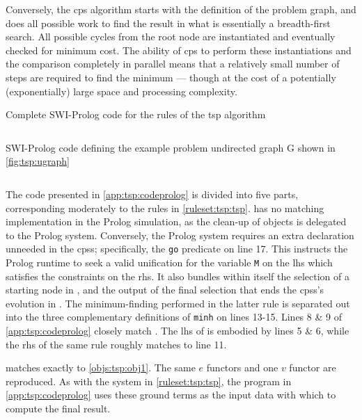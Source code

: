 Conversely, the \gls{cps} algorithm starts with the definition of the problem graph, and does all possible work to find the result in what is essentially a breadth-first search.  All possible cycles from the root node are instantiated and eventually checked for minimum cost. The ability of \gls{cps} to perform these instantiations and the comparison completely in parallel means that a relatively small number of steps are required to find the minimum --- though at the cost of a potentially (exponentially) large space and processing complexity.

\begin{listing}
\caption[Complete SWI-Prolog code for the  algorithm]{\label{app:tsp:codeprolog}Complete SWI-Prolog code for the rules of the \gls{tsp} algorithm}
\inputminted[linenos,breaklines,frame=lines,autogobble,firstline=5]{prolog}{chapters/tsp/code/tsp.pl.txt}
\end{listing}

\begin{listing}
\caption{\label{app:tsp:probprolog}SWI-Prolog code defining the example problem undirected graph G shown in \cref{fig:tsp:ugraph}}
\inputminted[linenos,breaklines,frame=lines,autogobble,lastline=3]{prolog}{chapters/tsp/code/tsp.pl.txt}
\end{listing}

The code presented in \cref{app:tsp:codeprolog} is divided into five parts, corresponding moderately to the rules in \cref{ruleset:tsp:tsp}.   has no matching implementation in the Prolog simulation, as the clean-up of objects is delegated to the Prolog system.  Conversely, the Prolog system requires an extra declaration unneeded in the \glspl{cps}; specifically, the \texttt{go} predicate on line 17.  This instructs the Prolog runtime to seek a valid unification for the variable \texttt{M} on the \gls{lhs} which satisfies the constraints on the \gls{rhs}.  It also bundles within itself the selection of a starting node in , and the output of the final selection that ends the \glspl{cps}'s evolution in .  The minimum-finding performed in the latter rule is separated out into the three complementary definitions of \texttt{minh} on lines 13-15.  Lines 8 \& 9 of \cref{app:tsp:codeprolog} closely match .  The \gls{lhs} of  is embodied by lines 5 \& 6, while the \gls{rhs} of the same rule roughly matches to line 11.

 matches exactly to \cref{objs:tsp:obj1}.  The same \(e\) \glspl{functor} and one \(v\) \gls{functor} are reproduced.  As with the system in \cref{ruleset:tsp:tsp}, the program in \cref{app:tsp:codeprolog} uses these ground terms as the input data with which to compute the final result.